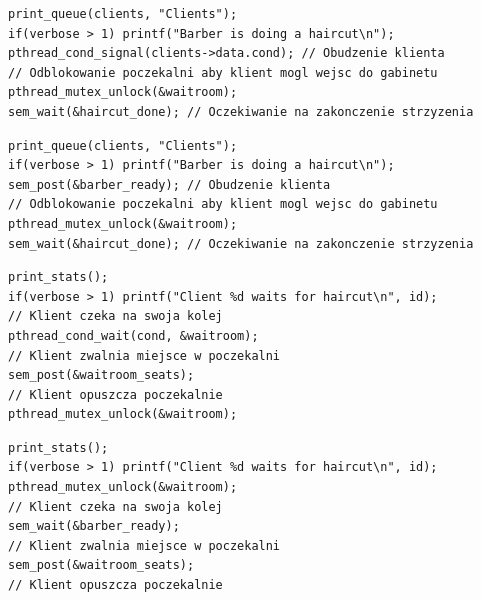 \documentclass[12pt,a4paper]{article}
\begin{document}
	\begin{center}
		\begin{minipage}{0.8\linewidth}
\begin{lstlisting}[caption = Fryzjer ze zmiennymi warunkowymi.]
print_queue(clients, "Clients");
if(verbose > 1) printf("Barber is doing a haircut\n");
pthread_cond_signal(clients->data.cond); // Obudzenie klienta
// Odblokowanie poczekalni aby klient mogl wejsc do gabinetu
pthread_mutex_unlock(&waitroom);
sem_wait(&haircut_done); // Oczekiwanie na zakonczenie strzyzenia
\end{lstlisting}
		\end{minipage}
	\end{center}

\begin{center}
		\begin{minipage}{0.8\linewidth}
\begin{lstlisting}[caption = Fryzjer bez zmiennych warunkowych.]
print_queue(clients, "Clients");
if(verbose > 1) printf("Barber is doing a haircut\n");
sem_post(&barber_ready); // Obudzenie klienta
// Odblokowanie poczekalni aby klient mogl wejsc do gabinetu
pthread_mutex_unlock(&waitroom);
sem_wait(&haircut_done); // Oczekiwanie na zakonczenie strzyzenia
\end{lstlisting}
		\end{minipage}
	\end{center}
	
	\begin{center}
		\begin{minipage}{0.8\linewidth}
\begin{lstlisting}[caption = Klient ze zmiennymi warunkowymi.]
print_stats();
if(verbose > 1) printf("Client %d waits for haircut\n", id);
// Klient czeka na swoja kolej
pthread_cond_wait(cond, &waitroom);
// Klient zwalnia miejsce w poczekalni
sem_post(&waitroom_seats);
// Klient opuszcza poczekalnie
pthread_mutex_unlock(&waitroom);
\end{lstlisting}
		\end{minipage}
	\end{center}


	\begin{center}
		\begin{minipage}{0.8\linewidth}
\begin{lstlisting}[caption = Klient bez zmiennych warunkowych.]
print_stats();
if(verbose > 1) printf("Client %d waits for haircut\n", id);
pthread_mutex_unlock(&waitroom);
// Klient czeka na swoja kolej
sem_wait(&barber_ready);
// Klient zwalnia miejsce w poczekalni
sem_post(&waitroom_seats);
// Klient opuszcza poczekalnie
\end{lstlisting}
		\end{minipage}
	\end{center}

	
\end{document}
